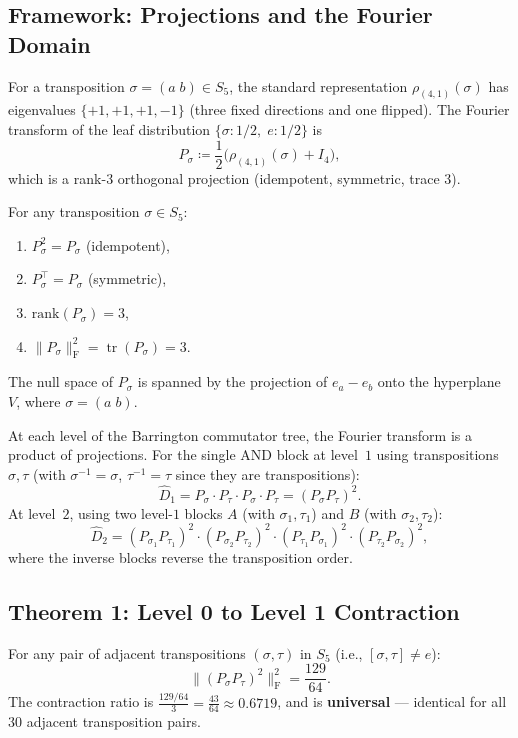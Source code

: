 \documentclass[version=submission]{iacrcc}
\DeclareMathOperator{\tr}{tr}
\newcommand{\norm}[1]{\lVert #1 \rVert}
\newcommand{\frob}[1]{\norm{#1}_{\mathrm{F}}}
\newcommand{\Dhat}{\widehat{D}}
\begin{document}
\subsection{Framework: Projections and the Fourier Domain}
\label{sec:framework}

For a transposition $\sigma = (a\;b) \in S_5$, the standard representation
$\rho_{(4,1)}(\sigma)$ has eigenvalues $\{+1, +1, +1, -1\}$ (three fixed
directions and one flipped). The Fourier transform of the leaf distribution
$\{\sigma : 1/2,\; e : 1/2\}$ is
\[
P_\sigma \coloneqq \frac{1}{2}\bigl(\rho_{(4,1)}(\sigma) + I_4\bigr),
\]
which is a rank-$3$ orthogonal projection (idempotent, symmetric, trace $3$).

\begin{lemma}
\label{lem:proj_basic}
For any transposition $\sigma \in S_5$:
\begin{enumerate}[label=(\alph*),nosep]
\item $P_\sigma^2 = P_\sigma$ (idempotent),
\item $P_\sigma^\top = P_\sigma$ (symmetric),
\item $\mathrm{rank}(P_\sigma) = 3$,
\item $\frob{P_\sigma}^2 = \tr(P_\sigma) = 3$.
\end{enumerate}
\end{lemma}

The null space of $P_\sigma$ is spanned by the projection of $e_a - e_b$
onto the hyperplane $V$, where $\sigma = (a\;b)$.

At each level of the Barrington commutator tree, the Fourier transform is a product
of projections. For the single AND block at level~$1$ using transpositions $\sigma, \tau$
(with $\sigma^{-1} = \sigma$, $\tau^{-1} = \tau$ since they are transpositions):
\[
\Dhat_1 = P_\sigma \cdot P_\tau \cdot P_\sigma \cdot P_\tau = (P_\sigma P_\tau)^2.
\]
At level~$2$, using two level-$1$ blocks $A$ (with $\sigma_1, \tau_1$) and
$B$ (with $\sigma_2, \tau_2$):
\[
\Dhat_2 = (P_{\sigma_1} P_{\tau_1})^2 \cdot (P_{\sigma_2} P_{\tau_2})^2
\cdot (P_{\tau_1} P_{\sigma_1})^2 \cdot (P_{\tau_2} P_{\sigma_2})^2,
\]
where the inverse blocks reverse the transposition order.


\subsection{Theorem 1: Level 0 to Level 1 Contraction}

\begin{theorem}
\label{thm:level01}
For any pair of adjacent transpositions $(\sigma, \tau)$ in $S_5$
(i.e., $[\sigma, \tau] \neq e$):
\[
\frob{(P_\sigma P_\tau)^2}^2 = \frac{129}{64}.
\]
The contraction ratio is $\frac{129/64}{3} = \frac{43}{64} \approx 0.6719$,
and is \textbf{universal} --- identical for all $30$ adjacent transposition pairs.
\end{theorem}
\end{document}
